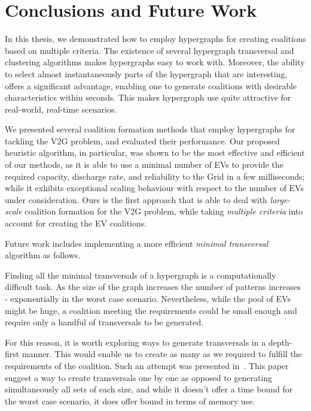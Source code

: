 
\chapter{Conclusions and Future Work} %

\label{Chapter8_results} %

	In this thesis, we demonstrated how to employ hypergraphs for creating coalitions based on multiple criteria.  
The existence of several hypergraph transversal and clustering algorithms
makes hypergraphs easy to work with. Moreover, the ability to select almost instantaneously parts of the hypergraph that are interesting, offers a significant advantage, 
enabling one to generate coalitions with desirable characteristics within seconds. This makes hypergraph use quite attractive for real-world, real-time scenarios.

We presented several coalition formation methods that employ hypergraphs for tackling the V2G problem, and evaluated their performance. 
Our proposed heuristic algorithm, in particular, was shown to be the most effective and efficient of our methods, 
as it is able to use a minimal number of EVs to provide the required capacity, discharge rate, and reliability to the Grid in a few milliseconds; while it exhibits exceptional scaling behaviour with respect to the number of EVs under consideration. Ours is the first approach that is able to deal with {\em large-scale} coalition formation for the V2G problem, while taking {\em multiple criteria} into account for creating the EV coalitions.

Future work includes implementing a more efficient {\em minimal transversal} algorithm as follows.

Finding all the minimal transversals of a hypergraph is a computationally difficult task. As the size of the graph increases the number of patterns increases - exponentially in the worst case scenario. Nevertheless, while the pool of EVs might be huge, a coalition meeting the requirements could be small enough and require only a handful of transversals to be generated. 

For this reason, it is worth exploring ways to generate transversals in a depth-first manner. This would enable us to create as many as we required to fulfill the requirements of the coalition. Such an attempt was presented in~\cite{kavvadias2005efficient}. This paper suggest a way to create transversals one by one as opposed to generating simultaneously all sets of each size, and while it doesn't offer a time bound for the worst case scenario, it does offer bound in terms of memory use.

